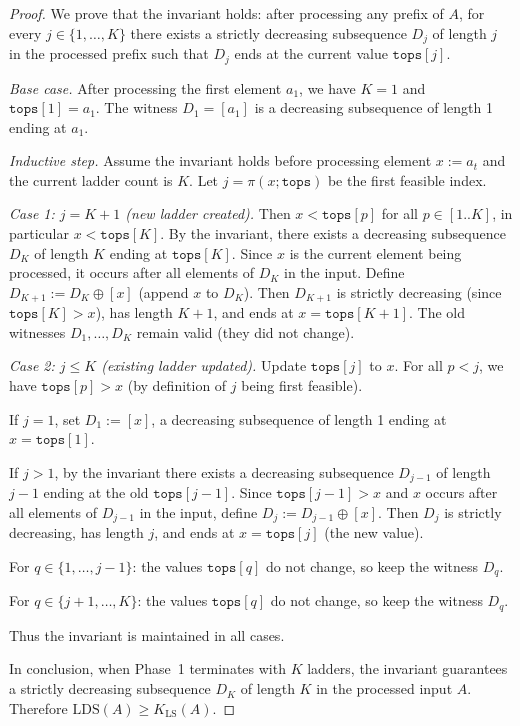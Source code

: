 \documentclass[12pt,a4paper]{article}
\theoremstyle{plain}
\theoremstyle{definition}
\newcommand{\tops}{\texttt{tops}}
\begin{document}
\begin{proof}
We prove that the invariant holds: after processing any prefix of $A$, for every
$j \in \{1, \ldots, K\}$ there exists a strictly decreasing subsequence $D_j$ of length $j$
in the processed prefix such that $D_j$ ends at the current value $\tops[j]$.

\emph{Base case.} After processing the first element $a_1$, we have $K=1$ and
$\tops[1] = a_1$. The witness $D_1 = [a_1]$ is a decreasing subsequence of length 1 ending at $a_1$.

\emph{Inductive step.} Assume the invariant holds before processing element $x := a_t$ and
the current ladder count is $K$. Let $j = \pi(x; \tops)$ be the first feasible index.

\textit{Case 1: $j = K+1$ (new ladder created).}
Then $x < \tops[p]$ for all $p \in [1..K]$, in particular $x < \tops[K]$.
By the invariant, there exists a decreasing subsequence $D_K$ of length $K$ ending at $\tops[K]$.
Since $x$ is the current element being processed, it occurs after all elements of $D_K$ in the input.
Define $D_{K+1} := D_K \oplus [x]$ (append $x$ to $D_K$). Then $D_{K+1}$ is strictly decreasing
(since $\tops[K] > x$), has length $K+1$, and ends at $x = \tops[K+1]$.
The old witnesses $D_1, \ldots, D_K$ remain valid (they did not change).

\textit{Case 2: $j \le K$ (existing ladder updated).}
Update $\tops[j]$ to $x$. For all $p < j$, we have $\tops[p] > x$ (by definition of $j$ being first feasible).

If $j = 1$, set $D_1 := [x]$, a decreasing subsequence of length 1 ending at $x = \tops[1]$.

If $j > 1$, by the invariant there exists a decreasing subsequence $D_{j-1}$ of length $j-1$
ending at the old $\tops[j-1]$. Since $\tops[j-1] > x$ and $x$ occurs after all elements of
$D_{j-1}$ in the input, define $D_j := D_{j-1} \oplus [x]$. Then $D_j$ is strictly decreasing,
has length $j$, and ends at $x = \tops[j]$ (the new value).

For $q \in \{1, \ldots, j-1\}$: the values $\tops[q]$ do not change, so keep the witness $D_q$.

For $q \in \{j+1, \ldots, K\}$: the values $\tops[q]$ do not change, so keep the witness $D_q$.

Thus the invariant is maintained in all cases.

In conclusion, when Phase~1 terminates with $K$ ladders, the invariant guarantees
a strictly decreasing subsequence $D_K$ of length $K$ in the processed input $A$.
Therefore $\mathrm{LDS}(A) \ge K_{\mathrm{LS}}(A)$.


\end{proof}
\end{document}
